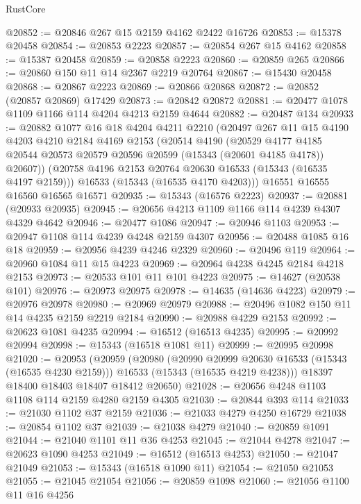 \begin{lexlean}{RustCore}
\begin{coremodule}
@20852 := @20846 @267 @15 @2159 @4162 @2422 @16726
@20853 := @15378 @20458
@20854 := @20853 @2223
@20857 := @20854 @267 @15 @4162
@20858 := @15387 @20458
@20859 := @20858 @2223
@20860 := @20859 @265
@20866 := @20860 @150 @11 @14 @2367 @2219 @20764
@20867 := @15430 @20458
@20868 := @20867 @2223
@20869 := @20866 @20868
@20872 := @20852 (@20857 @20869) @17429
@20873 := @20842 @20872
@20881 := @20477 @1078 @1109 @1166 @114 @4204 @4213 @2159 @4644
@20882 := @20487 @134
@20933 := @20882
    @1077
    @16
    @18
    @4204
    @4211
    @2210
    (@20497
      @267
      @11
      @15
      @4190
      @4203
      @4210
      @2184
      @4169
      @2153
      (@20514
        @4190
        (@20529
          @4177
          @4185
          @20544
          @20573
          @20579
          @20596
          @20599
          (@15343 (@20601 @4185 @4178))
          @20607))
      (@20758 @4196 @2153 @20764 @20630 @16533 (@15343 (@16535 @4197 @2159)))
      @16533
      (@15343 (@16535 @4170 @4203)))
    @16551
    @16555
    @16560
    @16565
    @16571
@20935 := @15343 (@16576 @2223)
@20937 := @20881 (@20933 @20935)
@20945 := @20656 @4213 @1109 @1166 @114 @4239 @4307 @4329 @4642
@20946 := @20477 @1086
@20947 := @20946 @1103
@20953 := @20947 @1108 @114 @4239 @4248 @2159 @4307
@20956 := @20488 @1085 @16 @18
@20959 := @20956 @4239 @4246 @2329
@20960 := @20496 @119
@20964 := @20960 @1084 @11 @15 @4223
@20969 := @20964 @4238 @4245 @2184 @4218 @2153
@20973 := @20533 @101 @11 @101 @4223
@20975 := @14627 (@20538 @101)
@20976 := @20973 @20975
@20978 := @14635 (@14636 @4223)
@20979 := @20976 @20978
@20980 := @20969 @20979
@20988 := @20496 @1082 @150 @11 @14 @4235 @2159 @2219 @2184
@20990 := @20988 @4229 @2153
@20992 := @20623 @1081 @4235
@20994 := @16512 (@16513 @4235)
@20995 := @20992 @20994
@20998 := @15343 (@16518 @1081 @11)
@20999 := @20995 @20998
@21020 := @20953
    (@20959
      (@20980
        (@20990 @20999 @20630 @16533 (@15343 (@16535 @4230 @2159)))
        @16533
        (@15343 (@16535 @4219 @4238)))
      @18397
      @18400
      @18403
      @18407
      @18412
      @20650)
@21028 := @20656 @4248 @1103 @1108 @114 @2159 @4280 @2159 @4305
@21030 := @20844 @393 @114
@21033 := @21030 @1102 @37 @2159
@21036 := @21033 @4279 @4250 @16729
@21038 := @20854 @1102 @37
@21039 := @21038 @4279
@21040 := @20859 @1091
@21044 := @21040 @1101 @11 @36 @4253
@21045 := @21044 @4278
@21047 := @20623 @1090 @4253
@21049 := @16512 (@16513 @4253)
@21050 := @21047 @21049
@21053 := @15343 (@16518 @1090 @11)
@21054 := @21050 @21053
@21055 := @21045 @21054
@21056 := @20859 @1098
@21060 := @21056 @1100 @11 @16 @4256

\end{coremodule}
\end{lexlean}
